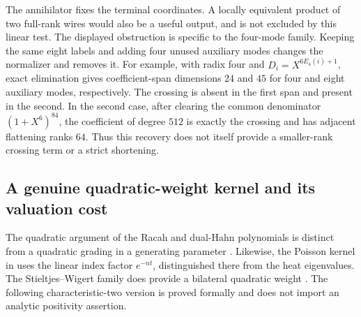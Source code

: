 The annihilator fixes the terminal coordinates. A locally equivalent product of two full-rank wires would also be a useful output, and is not excluded by this linear test. The displayed obstruction is specific to the four-mode family. Keeping the same eight labels and adding four unused auxiliary modes changes the normalizer and removes it. For example, with radix four and $D_i=X^{6E_4(i)+1}$, exact elimination gives coefficient-span dimensions $24$ and $45$ for four and eight auxiliary modes, respectively. The crossing is absent in the first span and present in the second. In the second case, after clearing the common denominator $(1+X^6)^{84}$, the coefficient of degree $512$ is exactly the crossing and has adjacent flattening ranks $64$. Thus this recovery does not itself provide a smaller-rank crossing term or a strict shortening.

\subsection{A genuine quadratic-weight kernel and its valuation cost}
The quadratic argument of the Racah and dual-Hahn polynomials is distinct from a quadratic grading in a generating parameter \cite[Table~18.25.1]{NISTDLMF}. Likewise, the Poisson kernel in \cite[equations~(1.6)--(1.10), pp.~1--2 of the preprint]{AlbaneseLawi2006} uses the linear index factor $e^{-nt}$, distinguished there from the heat eigenvalues. The Stieltjes--Wigert family does provide a bilateral quadratic weight \cite[equation~(2.2), Corollary~2.4 and Remark~2.5, pp.~2--5]{ChristiansenKoelink2006}. The following characteristic-two version is proved formally and does not import an analytic positivity assertion.

